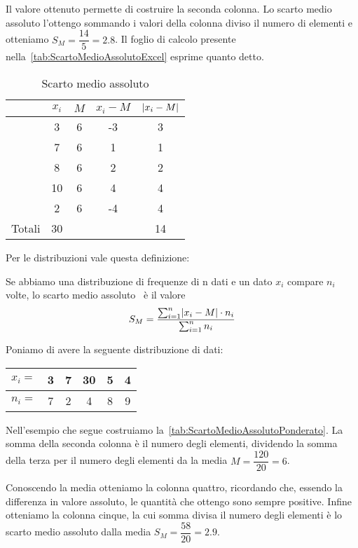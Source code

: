 Il valore ottenuto permette di costruire la seconda colonna. Lo scarto medio assoluto  l'ottengo sommando i valori della colonna diviso il numero di elementi e otteniamo  $S_{M}=\dfrac{14}{5}=\num{2.8}$. Il foglio di calcolo presente nella~\vref{tab:ScartoMedioAssolutoExcel} esprime quanto detto.
\begin{table}
	\centering
	\begin{tabular}{l*{4} {S[table-format=2.0]}}
		\toprule
	&{$x_{i}$}&{$M$}&{$x_{i}-M$}	& {$\abs{x_{i}-M} $} \\
	\midrule 
		&3&6&-3&3\\ 
		&7&6&1&1  \\ 
		&8&6&2& 2 \\ 
		&10&6&4&4  \\ 
		&2&6&-4& 4 \\ 
		\midrule
		{Totali}&30&&&14  \\
		\bottomrule 
	\end{tabular} 
	\caption{Scarto medio assoluto}
	\label{tab:ScartoMedioAssoluto}
\end{table}
Per le distribuzioni vale questa definizione:
\begin{defn}
	Se abbiamo una distribuzione di frequenze di n dati e un dato $x_{i}$ compare $n_{i}$ volte,  lo scarto medio assoluto~ è  il valore \[ S_{M}=\dfrac{\sum_{i=1}^{n}\abs{x_{i}-M}\cdot n_{i} }{  \sum_{i=1}^{n} n_{i}}\]
\end{defn}
Poniamo di avere la seguente distribuzione di dati:
\begin{center}
	\begin{tabular}{l*{2} {S[table-format=1.0]}S[table-format=2.0]*{2} {S[table-format=1.0]}}
		{$x_{i}=$}	&3  &7  &30  &5  &4 \\
		\midrule 
		{$n_{i}=$}	& 7 &2  & 4 & 8 & 9\\   
	\end{tabular}
\end{center}
Nell'esempio che segue costruiamo la~\vref{tab:ScartoMedioAssolutoPonderato}.  La somma della seconda colonna è il numero degli elementi, dividendo la somma della terza per il numero degli elementi da la media $M=\dfrac{\num{120}}{\num{20}}=\num{6}$. 

Conoscendo la media otteniamo la colonna quattro, ricordando che, essendo la differenza in valore assoluto, le quantità che ottengo sono sempre positive. Infine otteniamo la colonna cinque, la cui somma divisa il numero degli elementi è lo scarto medio assoluto dalla media $S_{M}=\dfrac{\num{58}}{\num{20}}=\num{2.9}$. 

